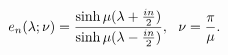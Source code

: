 \begin{equation}
e_{n}(\lambda; \nu)=\frac{\sinh \mu(\lambda+{in\over 2})}{\sinh
\mu(\lambda-{in \over 2})}, ~~\nu={\pi \over \mu}. \nonumber
\end{equation}

